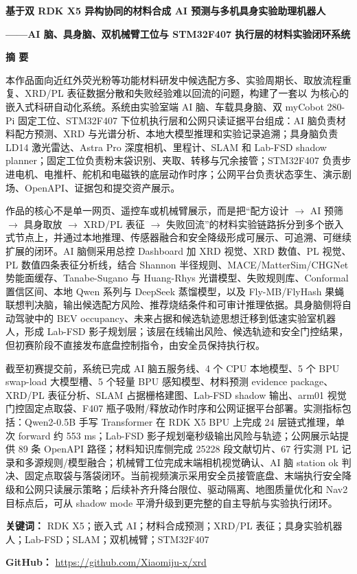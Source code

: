 \thispagestyle{empty}
\vspace*{0.2em}
{\centering
{\LARGE\bfseries 基于双 RDK X5 异构协同的材料合成 AI 预测与多机具身实验助理机器人}\par
\vspace{0.5em}
{\large\bfseries ——AI 脑、具身脑、双机械臂工位与 STM32F407 执行层的材料实验闭环系统}\par
}
\vspace{1.1em}

\begin{center}
  \textbf{\large 摘 \quad 要}
\end{center}

本作品面向近红外荧光粉等功能材料研发中候选配方多、实验周期长、取放流程重复、XRD/PL 表征数据分散和失败经验难以回流的问题，构建了一套以 为核心的嵌入式科研自动化系统。系统由实验室端 AI 脑、车载具身脑、双 myCobot 280-Pi 固定工位、STM32F407 下位机执行层和公网只读证据平台组成：AI 脑负责材料配方预测、XRD 与光谱分析、本地大模型推理和实验记录追溯；具身脑负责 LD14 激光雷达、Astra Pro 深度相机、里程计、SLAM 和 Lab-FSD shadow planner；固定工位负责粉末袋识别、夹取、转移与冗余接管；STM32F407 负责步进电机、电推杆、舵机和电磁铁的底层动作时序；公网平台负责状态孪生、演示剧场、OpenAPI、证据包和提交资产展示。

作品的核心不是单一网页、遥控车或机械臂展示，而是把“配方设计 $\rightarrow$ AI 预筛 $\rightarrow$ 具身取放 $\rightarrow$ XRD/PL 表征 $\rightarrow$ 失败回流”的材料实验链路拆分到多个嵌入式节点上，并通过本地推理、传感器融合和安全降级形成可展示、可追溯、可继续扩展的闭环。AI 脑侧采用总控 Dashboard 加 XRD 视觉、XRD 数值、PL 视觉、PL 数值四条表征分析线，结合 Shannon 半径规则、MACE/MatterSim/CHGNet 势能面缓存、Tanabe-Sugano 与 Huang-Rhys 光谱模型、失败规则库、Conformal 置信区间、本地 Qwen 系列与 DeepSeek 蒸馏模型，以及 Fly-MB/FlyHash 果蝇联想判决脑，输出候选配方风险、推荐烧结条件和可审计推理依据。具身脑侧将自动驾驶中的 BEV occupancy、未来占据和候选轨迹思想迁移到低速实验室机器人，形成 Lab-FSD 影子规划层；该层在线输出风险、候选轨迹和安全门控结果，但初赛阶段不直接发布底盘控制指令，由安全员保持执行权。

截至初赛提交前，系统已完成 AI 脑五服务线、4 个 CPU 本地模型、5 个 BPU swap-load 大模型槽、5 个轻量 BPU 感知模型、材料预测 evidence package、XRD/PL 表征分析、SLAM 占据栅格建图、Lab-FSD shadow 输出、arm01 视觉门控固定点取袋、F407 瓶子吸附/释放动作时序和公网证据平台部署。实测指标包括：Qwen2-0.5B 手写 Transformer 在 RDK X5 BPU 上完成 24 层链式推理，单次 forward 约 553 ms；Lab-FSD 影子规划毫秒级输出风险与轨迹；公网展示站提供 89 条 OpenAPI 路径；材料知识库侧完成 25228 段文献切片、67 行实测 PL 记录和多源规则/模型融合；机械臂工位完成末端相机视觉确认、AI 脑 station ok 判决、固定点取袋与落袋闭环。当前视频演示采用安全员接管底盘、末端执行安全降级和公网只读展示策略；后续补齐升降台限位、驱动隔离、地图质量优化和 Nav2 目标点后，可从 shadow mode 平滑升级到更完整的自主导航与实验执行闭环。

\vspace{0.8em}
\noindent\textbf{关键词：} RDK X5；嵌入式 AI；材料合成预测；XRD/PL 表征；具身实验机器人；Lab-FSD；SLAM；双机械臂；STM32F407

\vspace{0.4em}
\noindent\textbf{GitHub：} \url{https://github.com/Xiaomiju-x/xrd}

